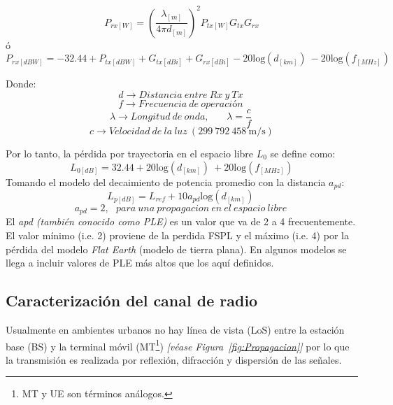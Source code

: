 \begin{equation}
P_{rx\left[W\right]}={\left(\frac{{\lambda }_{[m]}}{4\pi d_{[m]}}\right)}^2P_{tx\left[W\right]}G_{tx}G_{rx}  
\label{eqn:Friis}
\end{equation}
ó
\begin{equation}
P_{rx\left[dBW\right]}=-32.44+P_{tx\left[dBW\right]}+G_{tx\left[dBi\right]}+G_{rx\left[dBi\right]}-20{\mathrm{log} \left(d_{\left[km\right]}\right)\ }-20{\mathrm{log} \left(f_{\left[MHz\right]}\right)\ }
\label{eqn:Friss_dB}
\end{equation}

Donde:
\[d\to Distancia\ entre\ Rx\ y\ Tx\ \] 
\[f\to Frecuencia\ de\ operaci\textrm{ó}n\ \] 
\[\lambda \to Longitud\ de\ onda,\ \ \ \ \ \ \ \ \lambda =\frac{c}{f}\ \] 
\[c\to Velocidad\ de\ la\ luz\ (\mathrm{299\ 792\ 458\ m/s})\] 

Por lo tanto, la pérdida por trayectoria en el espacio libre $L_0$ se define como:
\begin{equation}
L_{0[dB]}=32.44+20{\mathrm{log} \left(d_{\left[km\right]}\right)\ }+20\mathrm{log}\mathrm{}(f_{[MHz]})
\label{eqn:L0}
\end{equation}
Tomando el modelo del decaimiento de potencia promedio con la distancia $a_{pd}$:
\begin{equation}
L_{p[dB]}=L_{ref}+10a_{pd}{\mathrm{log} \left(d_{\left[km\right]}\right)\ }
\label{eqn:Lp_ref}
\end{equation}
\[a_{pd}=2,\ \ \ para\ una\ propagacion\ en\ el\ espacio\ libre\ \] 
El \textit{apd (también conocido como PLE)} es un valor que va de 2 a 4 frecuentemente. El valor mínimo (i.e. 2) proviene de la perdida FSPL y el máximo (i.e. 4) por la pérdida del modelo \textit{Flat Earth} (modelo de tierra plana). En algunos modelos se llega a incluir valores de PLE más altos que los aquí definidos.

\subsection{Caracterización del canal de radio}

Usualmente en ambientes urbanos no hay línea de vista (LoS) entre la estación base (BS) y la terminal móvil (MT\footnote{MT y UE son términos análogos.}) \textit{[véase Figura~\ref{fig:Propagacion}]} por lo que la transmisión es realizada por reflexión, difracción y dispersión de las señales.\newline

